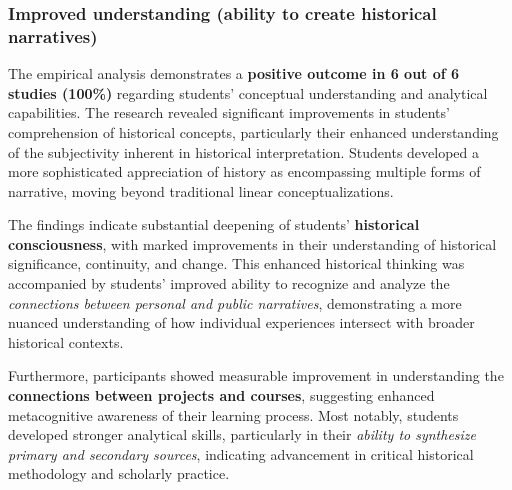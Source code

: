 \documentclass[
hf,
]{ceurart}
\begin{document}
\subsubsection{Improved understanding (ability to create historical narratives)}


The empirical analysis demonstrates a \textbf{positive outcome in 6 out of 6 studies (100\%)} regarding students' conceptual understanding and analytical capabilities. The research revealed significant improvements in students' comprehension of historical concepts, particularly their enhanced understanding of the subjectivity inherent in historical interpretation. Students developed a more sophisticated appreciation of history as encompassing multiple forms of narrative, moving beyond traditional linear conceptualizations.

The findings indicate substantial deepening of students' \textbf{historical consciousness}, with marked improvements in their understanding of historical significance, continuity, and change. This enhanced historical thinking was accompanied by students' improved ability to recognize and analyze the \textit{connections between personal and public narratives}, demonstrating a more nuanced understanding of how individual experiences intersect with broader historical contexts.

Furthermore, participants showed measurable improvement in understanding the \textbf{connections between projects and courses}, suggesting enhanced metacognitive awareness of their learning process. Most notably, students developed stronger analytical skills, particularly in their \textit{ability to synthesize primary and secondary sources}, indicating advancement in critical historical methodology and scholarly practice.
\end{document}
